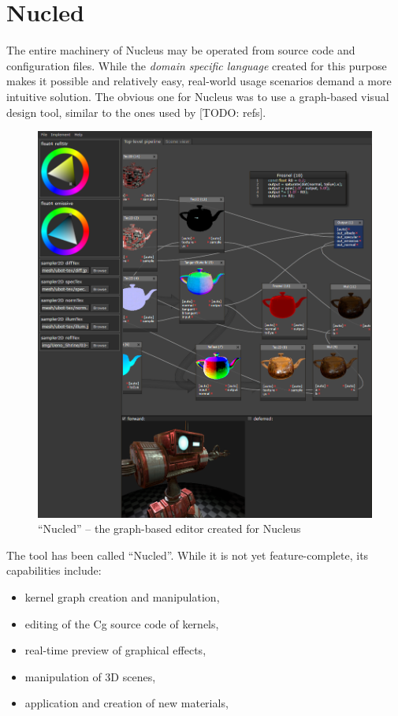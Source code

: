 
\chapter{ Nucled }
\label{Chapter5}

The entire machinery of Nucleus may be operated from source code and configuration files. While the \emph{ domain specific language } created for this purpose makes it possible and relatively easy, real-world usage scenarios demand a more intuitive solution. The obvious one for Nucleus was to use a graph-based visual design tool, similar to the ones used by [TODO: refs].

\begin{figure}[h!]
  \centering
    \includegraphics[width=0.9\linewidth]{./Figures/Nucled.png}
    \caption[Nucled]{``Nucled'' -- the graph-based editor created for Nucleus}
  \label{fig:Nucled}
\end{figure}


The tool has been called ``Nucled''. While it is not yet feature-complete, its capabilities include:

\begin{itemize}
\item kernel graph creation and manipulation,
\item editing of the Cg source code of kernels,
\item real-time preview of graphical effects,
\item manipulation of 3D scenes,
\item application and creation of new materials,
\end{itemize}

